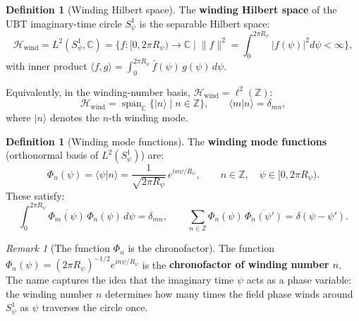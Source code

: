 \documentclass[12pt,a4paper]{article}
\theoremstyle{definition}
\newtheorem{definition}[theorem]{Definition}
\theoremstyle{remark}
\newtheorem{remark}[theorem]{Remark}
\begin{document}
\begin{definition}[Winding Hilbert space]
\label{def:chron:Hwind}
The \textbf{winding Hilbert space} of the UBT imaginary-time circle $S^1_\psi$
is the separable Hilbert space:
\begin{equation}
  \mathcal{H}_{\mathrm{wind}}
  = L^2(S^1_\psi, \mathbb{C})
  = \bigl\{ f: [0,2\pi R_\psi) \to \mathbb{C}
    \;\big|\; \|f\|^2 = \int_0^{2\pi R_\psi} |f(\psi)|^2 d\psi < \infty \bigr\},
  \label{eq:chron:Hwind_L2}
\end{equation}
with inner product $\langle f, g \rangle = \int_0^{2\pi R_\psi} \bar{f}(\psi)\,g(\psi)\,d\psi$.

Equivalently, in the winding-number basis, $\mathcal{H}_{\mathrm{wind}} = \ell^2(\mathbb{Z})$:
\begin{equation}
  \mathcal{H}_{\mathrm{wind}}
  = \overline{\operatorname{span}_\mathbb{C}}\bigl\{ |n\rangle \;\big|\; n \in \mathbb{Z} \bigr\},
  \qquad
  \langle m | n \rangle = \delta_{mn},
  \label{eq:chron:Hwind_ell2}
\end{equation}
where $|n\rangle$ denotes the $n$-th winding mode.
\end{definition}

\begin{definition}[Winding mode functions]
\label{def:chron:modes}
The \textbf{winding mode functions} (orthonormal basis of $L^2(S^1_\psi)$) are:
\begin{equation}
  \Phi_n(\psi)
  = \langle \psi | n \rangle
  = \frac{1}{\sqrt{2\pi R_\psi}}\, e^{in\psi/R_\psi},
  \qquad n \in \mathbb{Z},\quad \psi \in [0, 2\pi R_\psi).
  \label{eq:chron:winding_modes}
\end{equation}
These satisfy:
\begin{equation}
  \int_0^{2\pi R_\psi} \overline{\Phi_m(\psi)}\,\Phi_n(\psi)\,d\psi = \delta_{mn},
  \qquad
  \sum_{n \in \mathbb{Z}} \Phi_n(\psi)\,\overline{\Phi_n(\psi')} = \delta(\psi-\psi').
  \label{eq:chron:completeness}
\end{equation}
\end{definition}

\begin{remark}[The function $\Phi_n$ is the chronofactor]
\label{rem:chron:Phin_is_cf}
The function $\Phi_n(\psi) = (2\pi R_\psi)^{-1/2} e^{in\psi/R_\psi}$ is the
\textbf{chronofactor of winding number $n$}.  The name captures the idea that
the imaginary time $\psi$ acts as a phase variable: the winding number $n$
determines how many times the field phase winds around $S^1_\psi$ as
$\psi$ traverses the circle once.
\end{remark}
\end{document}
